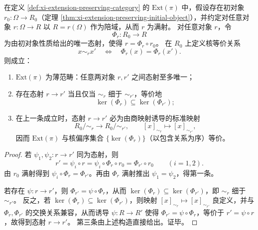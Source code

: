 \begin{theorem}\label{thm:conclusion-extpi-kernel-poset-classification}
在定义 \ref{def:xi-extension-preserving-category} 的 \(\mathrm{Ext}(\pi)\) 中，假设存在初对象 \(r_0:\Omega\to R_0\)（定理 \ref{thm:xi-extension-preserving-initial-object}），并约定对任意对象 \(r:\Omega\to R\) 以 \(R=r(\Omega)\) 作为陪域，从而 \(r\) 为满射。
对任意对象 \(r\)，令
\[
\Phi_r:R_0\to R
\]
为由初对象性质给出的唯一态射，使得 \(r=\Phi_r\circ r_0\)。
在 \(R_0\) 上定义核等价关系
\[
x\sim_r x'\quad\Longleftrightarrow\quad \Phi_r(x)=\Phi_r(x').
\]
则成立：
\begin{enumerate}
  \item \(\mathrm{Ext}(\pi)\) 为薄范畴：任意两对象 \(r,r'\) 之间态射至多唯一；
  \item 存在态射 \(r\to r'\) 当且仅当 \(\sim_r\) 细于 \(\sim_{r'}\)，等价地
  \[
  \ker(\Phi_r)\subseteq \ker(\Phi_{r'});
  \]
  \item 在上一条成立时，态射 \(r\to r'\) 必为由商映射诱导的标准映射
  \[
  R_0/\!\sim_r\longrightarrow R_0/\!\sim_{r'},\qquad [x]_{\sim_r}\longmapsto [x]_{\sim_{r'}},
  \]
  因而 \(\mathrm{Ext}(\pi)\) 与核偏序集合 \(\{\ker(\Phi_r)\}\)（以包含关系为序）等价。
\end{enumerate}
\end{theorem}

\begin{proof}
若 \(\psi_1,\psi_2:r\to r'\) 同为态射，则
\[
r'=\psi_i\circ r=\psi_i\circ \Phi_r\circ r_0=\Phi_{r'}\circ r_0
\qquad (i=1,2).
\]
由 \(r_0\) 满射得到 \(\psi_i\circ \Phi_r=\Phi_{r'}\)。再由 \(\Phi_r\) 满射推出 \(\psi_1=\psi_2\)，得第一条。

若存在 \(\psi:r\to r'\)，则 \(\Phi_{r'}=\psi\circ\Phi_r\)，从而 \(\ker(\Phi_r)\subseteq \ker(\Phi_{r'})\)，即 \(\sim_r\) 细于 \(\sim_{r'}\)。
反之，若 \(\ker(\Phi_r)\subseteq \ker(\Phi_{r'})\)，则映射 \([x]_{\sim_r}\mapsto [x]_{\sim_{r'}}\) 良定义，并与 \(\Phi_r,\Phi_{r'}\) 的交换关系兼容，从而诱导 \(\psi:R\to R'\) 使得 \(\Phi_{r'}=\psi\circ\Phi_r\)，等价于 \(r'=\psi\circ r\)，故得到态射 \(r\to r'\)。
第三条由上述构造直接给出。证毕。
\end{proof}

\endinput

